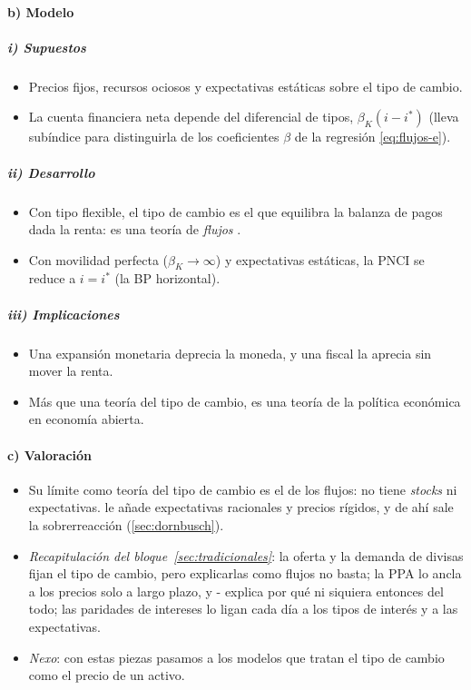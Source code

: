 \documentclass[11pt]{article}
\begin{document}
\paragraph{b) Modelo}
\subparagraph{i) Supuestos}
\begin{itemize}
\item Precios fijos, recursos ociosos y expectativas estáticas sobre el tipo de cambio.
\item La cuenta financiera neta depende del diferencial de tipos, $\beta_K(i-i^{*})$ (lleva subíndice para distinguirla de los coeficientes $\beta$ de la regresión \eqref{eq:flujos-e}).
\end{itemize}

\subparagraph{ii) Desarrollo}
\begin{itemize}
\item Con tipo flexible, el tipo de cambio es el que equilibra la balanza de pagos dada la renta: es una teoría de \emph{flujos} .
\item Con movilidad perfecta ($\beta_K\to\infty$) y expectativas estáticas, la PNCI se reduce a $i=i^{*}$ (la BP horizontal).
\end{itemize}

\subparagraph{iii) Implicaciones}
\begin{itemize}
\item Una expansión monetaria deprecia la moneda, y una fiscal la aprecia sin mover la renta.
\item Más que una teoría del tipo de cambio, es una teoría de la política económica en economía abierta.
\end{itemize}

\paragraph{c) Valoración}
\begin{itemize}
\item Su límite como teoría del tipo de cambio es el de los flujos: no tiene \emph{stocks} ni expectativas. \textcite{Dornbusch1976Expectations} le añade expectativas racionales y precios rígidos, y de ahí sale la sobrerreacción (\ref{sec:dornbusch}).
\end{itemize}

\begin{itemize}
\item \emph{Recapitulación del bloque~\ref{sec:tradicionales}}: la oferta y la demanda de divisas fijan el tipo de cambio, pero explicarlas como flujos no basta; la PPA lo ancla a los precios solo a largo plazo, y - explica por qué ni siquiera entonces del todo; las paridades de intereses lo ligan cada día a los tipos de interés y a las expectativas.
\item \emph{Nexo}: con estas piezas pasamos a los modelos que tratan el tipo de cambio como el precio de un activo.
\end{itemize}
\end{document}
